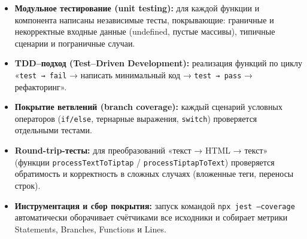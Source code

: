 \begin{itemize}
  \item \textbf{Модульное тестирование (unit testing):}  
    для каждой функции и компонента написаны независимые тесты, покрывающие:
    граничные и некорректные входные данные (undefined, пустые массивы), типичные сценарии и пограничные случаи.
  \item \textbf{TDD–подход (Test–Driven Development):}  
    реализация функций по циклу «\texttt{test → fail} → написать минимальный код → \texttt{test → pass} → рефакторинг».
  \item \textbf{Покрытие ветвлений (branch coverage):}  
    каждый сценарий условных операторов (\texttt{if/else}, тернарные выражения, \texttt{switch}) проверяется отдельными тестами.
  \item \textbf{Round-trip-тесты:}  
    для преобразований «текст → HTML → текст» (функции \texttt{processTextToTiptap} / \texttt{processTiptapToText}) проверяется обратимость и корректность в сложных случаях (вложенные теги, переносы строк).
  \item \textbf{Инструментация и сбор покрытия:}  
    запуск командой \texttt{npx jest --coverage} автоматически оборачивает счётчиками все исходники и собирает метрики Statements, Branches, Functions и Lines.
\end{itemize}
